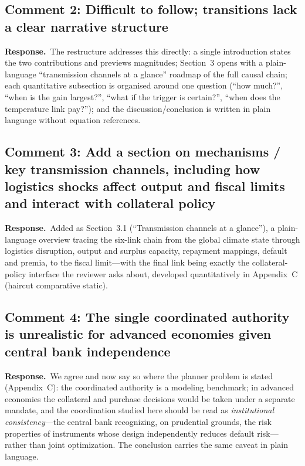 \documentclass[11pt]{article}
\newcommand{\response}{\par\noindent\textbf{Response.}\ }
\begin{document}
\subsection*{Comment 2: Difficult to follow; transitions lack a clear narrative structure}

\response The restructure addresses this directly: a single introduction states the two contributions and previews magnitudes; Section~3 opens with a plain-language ``transmission channels at a glance'' roadmap of the full causal chain; each quantitative subsection is organised around one question (``how much?'', ``when is the gain largest?'', ``what if the trigger is certain?'', ``when does the temperature link pay?''); and the discussion/conclusion is written in plain language without equation references.

\subsection*{Comment 3: Add a section on mechanisms / key transmission channels, including how logistics shocks affect output and fiscal limits and interact with collateral policy}

\response Added as Section~3.1 (``Transmission channels at a glance''), a plain-language overview tracing the six-link chain from the global climate state through logistics disruption, output and surplus capacity, repayment mappings, default and premia, to the fiscal limit---with the final link being exactly the collateral-policy interface the reviewer asks about, developed quantitatively in Appendix~C (haircut comparative static).

\subsection*{Comment 4: The single coordinated authority is unrealistic for advanced economies given central bank independence}

\response We agree and now say so where the planner problem is stated (Appendix~C): the coordinated authority is a modeling benchmark; in advanced economies the collateral and purchase decisions would be taken under a separate mandate, and the coordination studied here should be read as \emph{institutional consistency}---the central bank recognizing, on prudential grounds, the risk properties of instruments whose design independently reduces default risk---rather than joint optimization. The conclusion carries the same caveat in plain language.
\end{document}
